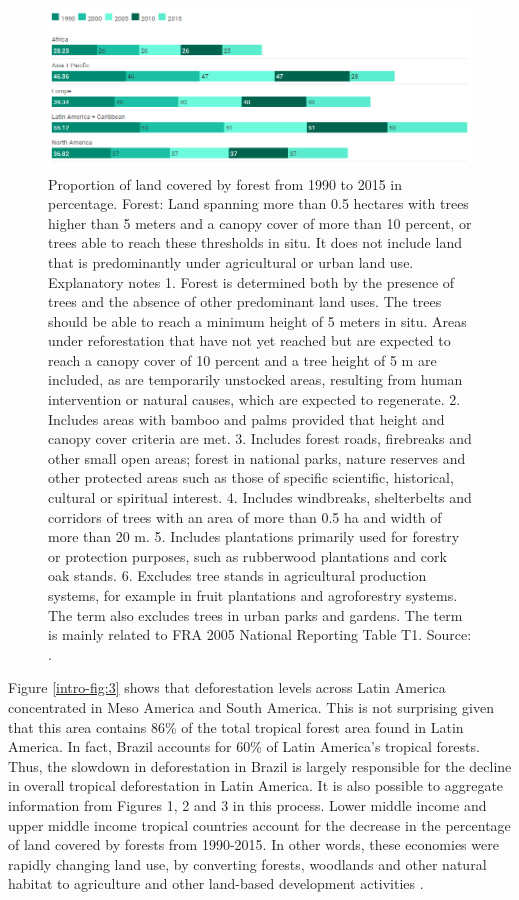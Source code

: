 \begin{figure}[htpb]
\centering
\includegraphics[width=1\linewidth]{Introduction/landcoveredbyforest.png}
\caption[Proportion of land covered by forest from 1990 to 2015 in percentage]{Proportion of land covered by forest from 1990 to 2015 in percentage. Forest: Land spanning more than 0.5 hectares with trees higher than 5 meters and a canopy cover of more than 10 percent, or trees able to reach these thresholds in situ. It does not include land that is predominantly under agricultural or urban land use. Explanatory notes 1. Forest is determined both by the presence of trees and the absence of other predominant land uses. The trees should be able to reach a minimum height of 5 meters in situ. Areas under reforestation that have not yet reached but are expected to reach a canopy cover of 10 percent and a tree height of 5 m are included, as are temporarily unstocked areas, resulting from human intervention or natural causes, which are expected to regenerate. 2. Includes areas with bamboo and palms provided that height and canopy cover criteria are met. 3. Includes forest roads, firebreaks and other small open areas; forest in national parks, nature reserves and other protected areas such as those of specific scientific, historical, cultural or spiritual interest. 4. Includes windbreaks, shelterbelts and corridors of trees with an area of more than 0.5 ha and width of more than 20 m. 5. Includes plantations primarily used for forestry or protection purposes, such as rubberwood plantations and cork oak stands. 6. Excludes tree stands in agricultural production systems, for example in fruit plantations and agroforestry systems. The term also excludes trees in urban parks and gardens. The term is mainly related to FRA 2005 National Reporting Table T1. Source: \citep{unep_2018}.}
\label{intro-fig:2}
\end{figure}

Figure \ref{intro-fig:3} shows that deforestation levels across Latin America concentrated
in Meso America and South America. This is not surprising given that this area contains 86\% of the total tropical forest area found in Latin America. In fact, Brazil accounts for 60\% of Latin America’s tropical forests. Thus, the slowdown in deforestation in Brazil is largely responsible for the decline in overall tropical deforestation in Latin America. It is also possible to aggregate information from Figures 1, 2 and 3 in this process. Lower middle income and upper middle income tropical countries account for the decrease in the percentage of land covered by forests from 1990-2015. In other words, these economies were rapidly changing land use, by converting forests, woodlands and other natural habitat to agriculture and other land-based development activities \citep{BARBIER2}.


